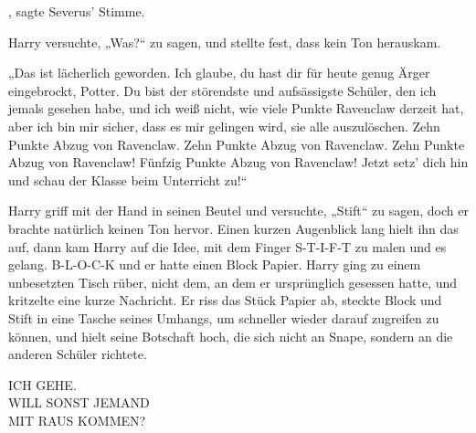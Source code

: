 , sagte Severus’ Stimme.

Harry versuchte, „Was?“ zu sagen, und stellte fest, dass kein Ton herauskam.

„Das ist lächerlich geworden. Ich glaube, du hast dir für heute genug Ärger eingebrockt, Potter. Du bist der störendste und aufsässigste Schüler, den ich jemals gesehen habe, und ich weiß nicht, wie viele Punkte Ravenclaw derzeit hat, aber ich bin mir sicher, dass es mir gelingen wird, sie alle auszulöschen. Zehn Punkte Abzug von Ravenclaw. Zehn Punkte Abzug von Ravenclaw. Zehn Punkte Abzug von Ravenclaw! Fünfzig Punkte Abzug von Ravenclaw! Jetzt setz’ dich hin und schau der Klasse beim Unterricht zu!“

Harry griff mit der Hand in seinen Beutel und versuchte, „Stift“ zu sagen, doch er brachte natürlich keinen Ton hervor. Einen kurzen Augenblick lang hielt ihn das auf, dann kam Harry auf die Idee, mit dem Finger S-T-I-F-T zu malen und es gelang. B-L-O-C-K und er hatte einen Block Papier. Harry ging zu einem unbesetzten Tisch rüber, nicht dem, an dem er ursprünglich gesessen hatte, und kritzelte eine kurze Nachricht. Er riss das Stück Papier ab, steckte Block und Stift in eine Tasche seines Umhangs, um schneller wieder darauf zugreifen zu können, und hielt seine Botschaft hoch, die sich nicht an Snape, sondern an die anderen Schüler richtete.

\begin{writtenNote}
ICH GEHE.\\
WILL SONST JEMAND\\
MIT RAUS KOMMEN?
\end{writtenNote}


